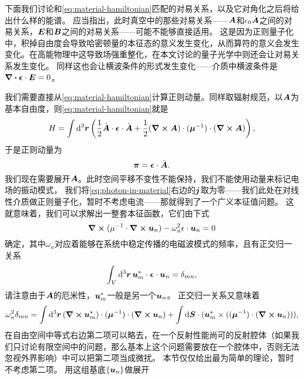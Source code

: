 下面我们讨论和\eqref{eq:material-hamiltonian}匹配的对易关系，以及它对角化之后将给出什么样的能谱。
应当指出，此时真空中的那些对易关系——$\vb*{A}$和$\epsilon_0 \dot{\vb*{A}}$之间的对易关系，$\vb*{E}$和$\vb*{B}$之间的对易关系——可能不能够直接适用。
这是因为正则量子化中，积掉自由度会导致哈密顿量的本征态的意义发生变化，从而算符的意义会发生变化。在高能物理中这导致场强重整化，在本文讨论的量子光学中则还会让对易关系发生变化。
同样这也会让横波条件的形式发生变化——介质中横波条件是$\div{\vb*{\epsilon} \cdot \vb*{E}} = 0$。

我们需要直接从\eqref{eq:material-hamiltonian}计算正则动量。同样取辐射规范，以$\vb*{A}$为基本自由度，则\eqref{eq:material-hamiltonian}就是
\begin{equation}
    H = \int \dd[3]{\vb*{r}} \left( \frac{1}{2} \dot{\vb*{A}} \cdot \vb*{\epsilon} \cdot \dot{\vb*{A}} + \frac{1}{2} (\curl{\vb*{A}}) \cdot (\vb*{\mu}^{-1}) \cdot (\curl{\vb*{A}}) \right),
\end{equation}
于是正则动量为
\begin{equation}
    \vb*{\pi} = \vb*{\epsilon} \cdot \dot{\vb*{\vb*{A}}}.
\end{equation}
我们现在需要展开$\vb*{A}$。此时空间平移不变性不能保持，我们不能使用动量来标记电场的振动模式，
我们将\eqref{eq:photon-in-material}右边的$\vb*{j}$取为零——我们此处在对线性介质做正则量子化，暂时不考虑电流——那就得到了一个广义本征值问题。
这就意味着，我们可以求解出一整套本征函数，它们由下式
\begin{equation}
    \curl{(\mu^{-1} \cdot \curl{\vb*{u}_n})} - \omega_n^2 \epsilon \cdot \vb*{u}_n = 0
\end{equation}
确定，其中$\omega_n$对应着能够在系统中稳定传播的电磁波模式的频率，且有正交归一关系
\begin{equation}
    \int_V \dd[3]{\vb*{r}} \vb*{u}^*_m \cdot \vb*{\epsilon} \cdot \vb*{u}_n = \delta_{mn}, 
\end{equation}
请注意由于$\vb*{A}$的厄米性，$\vb*{u}_m^*$一般是另一个$\vb*{u}_n$。
正交归一关系又意味着
\begin{equation}
    \omega_n^2 \delta_{mn} = \int \dd[3]{\vb*{r}} (\curl{\vb*{u}_m^*}) \cdot (\vb*{\mu}^{-1}) \cdot (\curl{\vb*{u}_n}) + \int \dd{\vb*{S}} \cdot (\vb*{u}_m^* \times ((\vb*{\mu}^{-1}) \cdot (\curl{\vb*{u}_n}))),
\end{equation}
在自由空间中等式右边第二项可以略去，在一个反射性能尚可的反射腔体（如果我们只讨论有限空间中的问题，那么基本上这个问题需要放在一个腔体中，否则无法忽视外界影响）中可以把第二项当成微扰。
本节仅仅给出最为简单的理论，暂时不考虑第二项。
用这组基底$\{\vb*{u}_n\}$做展开
